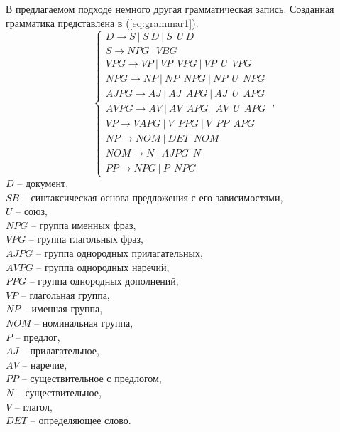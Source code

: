 \documentclass[../main]{subfiles}
\begin{document}
В предлагаемом подходе немного другая грамматическая запись. Созданная грамматика представлена в (\ref{eq:grammar1}).
\begin{equation}
    \label{eq:grammar1}
    \left\{ 
        \begin{array}{l}
            D \rightarrow S\ |\ S\ D\ |\ S\ \ U\ D\ \\
            S \rightarrow NPG\ \ \ VBG \\
            VPG \rightarrow VP\ |\ VP\ \ VPG\ |\ VP\ \ U\ \ VPG \\
            NPG \rightarrow NP\ |\ NP\ \ NPG\ |\ NP\ \ U\ \ NPG \\
            AJPG \rightarrow AJ\ |\ AJ\ \ APG\ |\ AJ\ \ U\ \ APG \\
            AVPG \rightarrow AV\ |\ AV\ \ APG\ |\ AV\ \ U\ \ APG \\
            VP \rightarrow V APG\ |\ V\ \ PPG\ |\ V\ \ PP\ \ APG \\
            NP \rightarrow NOM\ |\ DET\ \ NOM \\
            NOM \rightarrow N\ |\ AJPG\ \ N \\
            PP \rightarrow NPG\ |\ P\ \ NPG
        \end{array}
    \right.\ ,
\end{equation}
$D$ -- документ,\\
\makebox[12.5mm]{}$SB$ -- синтаксическая основа предложения с его зависимостями,\\
\makebox[12.5mm]{}$U$ -- союз,\\
\makebox[12.5mm]{}$NPG$ -- группа именных фраз,\\
\makebox[12.5mm]{}$VPG$ -- группа глагольных фраз,\\
\makebox[12.5mm]{}$AJPG$ -- группа однородных прилагательных,\\
\makebox[12.5mm]{}$AVPG$ -- группа однородных наречий,\\
\makebox[12.5mm]{}$PPG$ -- группа однородных дополнений,\\
\makebox[12.5mm]{}$VP$ -- глагольная группа,\\
\makebox[12.5mm]{}$NP$ -- именная группа,\\
\makebox[12.5mm]{}$NOM$ -- номинальная группа,\\
\makebox[12.5mm]{}$P$ -- предлог,\\
\makebox[12.5mm]{}$AJ$ -- прилагательное,\\
\makebox[12.5mm]{}$AV$ -- наречие,\\
\makebox[12.5mm]{}$PP$ -- существительное с предлогом,\\
\makebox[12.5mm]{}$N$ -- существительное,\\
\makebox[12.5mm]{}$V$ -- глагол,\\
\makebox[12.5mm]{}$DET$ -- определяющее слово.
\end{document}
